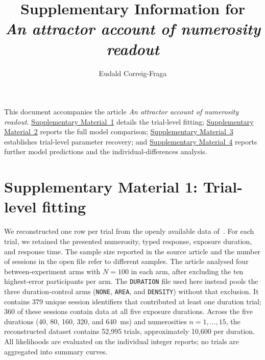 \documentclass[Afour,sageh,times]{sagej}
\begin{document}

\title{Supplementary Information for\\[0.5ex]
\itshape An attractor account of numerosity readout}

\author{Eudald Correig-Fraga}

\affiliation{%
\affilnum{1}Innovamat Education, Avinguda de la Generalitat, 217, Sant Cugat del Vallès, Catalonia (Spain)}



\maketitle

\noindent This document accompanies the article \emph{An attractor account of numerosity readout}. \hyperref[sm:methods]{Supplementary Material~1} details the trial-level fitting; \hyperref[sm:comparison]{Supplementary Material~2} reports the full model comparison; \hyperref[sm:recovery]{Supplementary Material~3} establishes trial-level parameter recovery; and \hyperref[sm:predictions]{Supplementary Material~4} reports further model predictions and the individual-differences analysis.

\section{Supplementary Material 1: Trial-level fitting}
\label{sm:methods}

We reconstructed one row per trial from the openly available data of~\citet{cheyette_unified_2020}. For each trial, we retained the presented numerosity, typed response, exposure duration, and response time. The sample size reported in the source article and the number of sessions in the open file refer to different samples. The article analysed four between-experiment arms with $N=100$ in each arm, after excluding the ten highest-error participants per arm. The \texttt{DURATION} file used here instead pools the three duration-control arms (\texttt{NONE}, \texttt{AREA}, and \texttt{DENSITY}) without that exclusion. It contains 379 unique session identifiers that contributed at least one duration trial; 360 of these sessions contain data at all five exposure durations. Across the five durations (40, 80, 160, 320, and 640~ms) and numerosities $n=1,\ldots,15$, the reconstructed dataset contains 52,995 trials, approximately 10,600 per duration. All likelihoods are evaluated on the individual integer reports; no trials are aggregated into summary curves.
\end{document}
